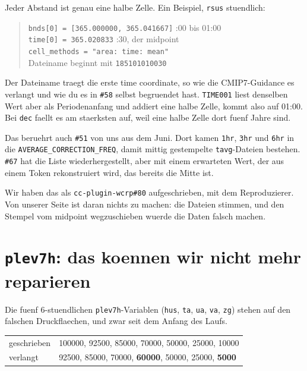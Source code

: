 \documentclass[11pt,a4paper]{article}
\newcommand{\code}[1]{\texttt{\small #1}}
\begin{document}
Jeder Abstand ist genau eine halbe Zelle. Ein Beispiel, \code{rsus} stuendlich:

\begin{quote}
\code{bnds[0] = [365.000000, 365.041667]} :00 bis 01:00 \\
\code{time[0] = 365.020833} :30, der midpoint \\
\code{cell\_methods = "area: time: mean"} \\
Dateiname beginnt mit \code{185101010030}
\end{quote}

Der Dateiname traegt die erste time coordinate, so wie die CMIP7-Guidance es
verlangt und wie du es in \code{\#58} selbst begruendet hast. \code{TIME001}
liest denselben Wert aber als Periodenanfang und addiert eine halbe Zelle,
kommt also auf 01:00. Bei \code{dec} faellt es am staerksten auf, weil eine
halbe Zelle dort fuenf Jahre sind.

Das beruehrt auch \code{\#51} von uns aus dem Juni. Dort kamen \code{1hr},
\code{3hr} und \code{6hr} in die \code{AVERAGE\_CORRECTION\_FREQ}, damit
mittig gestempelte \code{tavg}-Dateien bestehen. \code{\#67} hat die Liste
wiederhergestellt, aber mit einem erwarteten Wert, der aus einem Token
rekonstruiert wird, das bereits die Mitte ist.

Wir haben das als \code{cc-plugin-wcrp\#80} aufgeschrieben, mit dem
Reproduzierer. Von unserer Seite ist daran nichts zu machen: die Dateien
stimmen, und den Stempel vom midpoint wegzuschieben wuerde die Daten
falsch machen.

\section{\code{plev7h}: das koennen wir nicht mehr reparieren}

Die fuenf 6-stuendlichen \code{plev7h}-Variablen
(\code{hus}, \code{ta}, \code{ua}, \code{va}, \code{zg}) stehen auf den
falschen Druckflaechen, und zwar seit dem Anfang des Laufs.

\begin{center}
\begin{tabular}{ll}
\toprule
geschrieben & 100000, 92500, 85000, 70000, 50000, 25000, 10000 \\
verlangt    & 92500, 85000, 70000, \textbf{60000}, 50000, 25000, \textbf{5000} \\
\bottomrule
\end{tabular}
\end{center}
\end{document}
